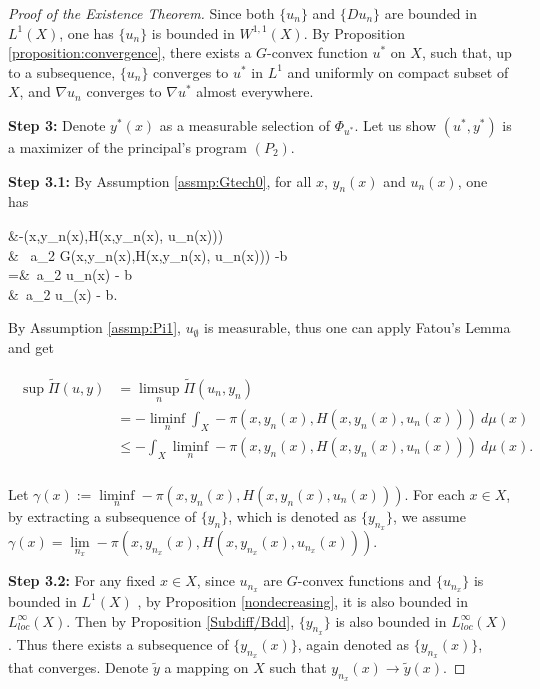 \begin{proof}[Proof of the Existence Theorem]
	Since both $\{u_n\}$ and $\{Du_n\}$ are bounded in $L^1(X)$, one has $\{u_n\}$ is bounded in $W^{1,1}(X)$. By Proposition \ref{proposition:convergence}, there exists a $G$-convex function $u^*$ on $X$, such that, up to a subsequence, $\{u_n\}$ converges to $u^*$ in $L^1$ and uniformly on compact subset of $X$, and $\nabla u_n$ converges to $\nabla u^*$ almost everywhere.\medskip
	
	{\bf Step 3: } Denote $y^*(x)$ as a measurable selection of $\Phi_{u^*}$. Let us show $(u^*,y^*)$ is a maximizer of the principal's program $(P_2)$. \medskip
	
	{\bf Step 3.1: }By Assumption \ref{assmp:Gtech0}, for all $x$, $y_n(x)$ and $u_n(x)$,
	one has
	\begin{flalign*}
	&-\pi(x,y_n(x),H(x,y_n(x), u_n(x)))\\
	\ge & \ a_2 G(x,y_n(x),H(x,y_n(x), u_n(x))) -b \\
	=&\  a_2 u_n(x) - b \\
	\ge&\ a_2 u_{\emptyset}(x) - b.
	\end{flalign*}

 
	By Assumption \ref{assmp:Pi1}, $u_{\emptyset}$ is measurable, thus one can apply Fatou's Lemma and get
	
	\begin{align}\label{3}
	\begin{split}
	\sup \tilde{\Pi}(u,y) & = \limsup\limits_{n} \tilde{\Pi}(u_n, y_n) \\
	&= -\liminf\limits_{n} \int_{X} - \pi(x, y_n(x), H(x,y_n(x),u_n(x)))  ~d\mu(x)\\
	& \le - \int_{X} \liminf\limits_{n} - \pi(x, y_n(x), H(x,y_n(x),u_n(x)))~ d\mu(x). \\
	\end{split}
	\end{align}
	
	Let $\gamma(x):=\liminf\limits_{n} - \pi(x, y_n(x), H(x,y_n(x),u_n(x)))$. 
 For each $x\in X$, by extracting a subsequence of $\{y_{n} \}$, which is denoted as $\{y_{n_x}\}$, we assume $\gamma(x) = \lim\limits_{n_x} - \pi(x, y_{n_x}(x), H(x,y_{n_x}(x),u_{n_x}(x)))$. \medskip
	
	{\bf Step 3.2: } For any fixed $x \in X$, since $u_{n_x}$ are $G$-convex functions and $\{u_{n_x}\}$ is bounded in $L^1(X)$%
	, by Proposition \ref{nondecreasing}, it is also bounded in $L_{loc}^{\infty}(X)$. 	Then by Proposition \ref{Subdiff/Bdd}, $\{y_{n_x}\}$ is also bounded in $L_{loc}^{\infty}(X)$ . Thus there exists a subsequence of $\{y_{n_x}(x)\}$, again denoted as $\{y_{n_x}(x)\}$, that converges. Denote $\tilde{y}$ a mapping on $X$ such that $y_{n_x}(x) \rightarrow \tilde{y}(x)$.\medskip
	

\end{proof}
